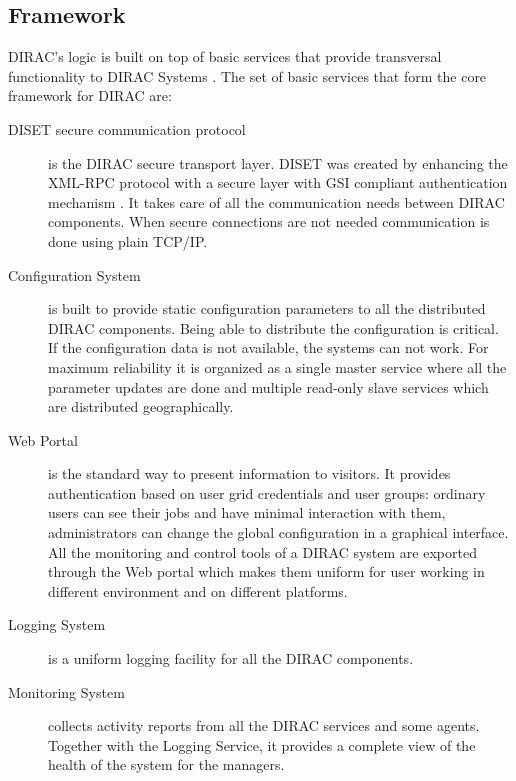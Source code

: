 \subsection{Framework}
DIRAC’s logic is built on top of basic services that provide transversal
functionality to DIRAC Systems \cite{DISET}. The set of basic services that form the core framework for
DIRAC are: 

\begin{description}

\item[DISET secure communication protocol] 
	is the DIRAC secure transport layer. DISET was created by enhancing the XML-RPC
	protocol with a secure layer with GSI compliant authentication mechanism \cite{DISET2}.
	It takes care of all the communication needs between DIRAC components. 
	When secure connections are not needed communication is done using plain TCP/IP.
	
\item[Configuration System] 
	is built to provide static configuration parameters to all the distributed DIRAC components. Being able to
	distribute the configuration is critical. If the configuration data is not available, 
	the systems can not work. For maximum reliability it is organized as a single master service where 
	all the parameter updates are done and multiple read-only slave services which are distributed geographically.

\item[Web Portal]  
	is the standard way to present information to visitors. It provides authentication based on user grid
	credentials and user groups: ordinary users can see their jobs and have minimal interaction with
	them, administrators can change the global configuration in a graphical interface.
	All the monitoring and control tools of a DIRAC system are exported through the Web portal 
	which makes them uniform for user working in different environment and on different platforms.
	
\item[Logging System] 
	is a uniform logging facility for all the DIRAC components.

\item[Monitoring System]
	collects activity reports from all the DIRAC services and some agents. Together
	with the Logging Service, it provides a complete view of the health of the system for the managers.

\end{description}

